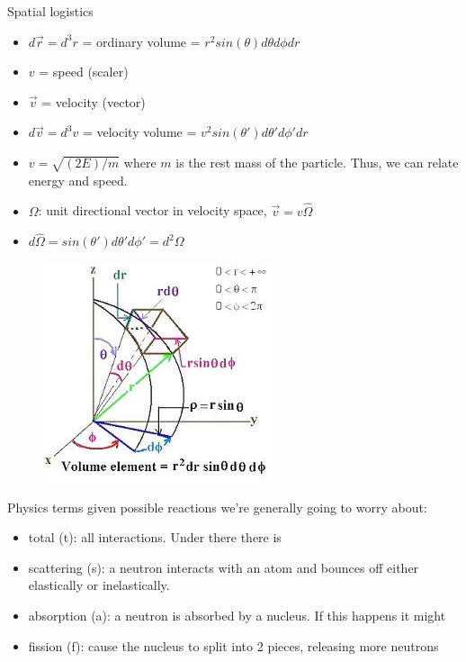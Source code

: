 \documentclass[12pt]{article}
\newcommand{\vOmega}{\ensuremath{\hat{\Omega}}}
\begin{document}
Spatial logistics
\begin{itemize}
\item $d\vec{r} = d^3r$ = ordinary volume = $r^2 sin(\theta) d\theta d\phi dr$
%
\item $v$ = speed (scaler)
\item $\vec{v}$ = velocity (vector)
\item $d\vec{v} = d^3v$ = velocity volume = $v^2 sin(\theta')d\theta' d\phi' dr$
\item $v = \sqrt{(2E)/m}$ where $m$ is the rest mass of the particle. Thus, we can relate energy and speed.

\item $\Omega$: unit directional vector in velocity space, $\vec{v} = v\vOmega$
\item $d\vOmega = sin(\theta')d\theta' d\phi' =  d^2\Omega$
\end{itemize}

\begin{figure}[h!]
\begin{center}
\includegraphics[height=2 in]{VolumeElement}
\end{center}
\end{figure}

Physics terms given possible reactions we're generally going to worry about:
\begin{itemize}
\item total (t): all interactions. Under there there is 
\item scattering (s): a neutron interacts with an atom and bounces off either elastically or inelastically.
\item absorption (a): a neutron is absorbed by a nucleus. If this happens it might
\item fission (f): cause the nucleus to split into 2 pieces, releasing more neutrons
\end{itemize}
\end{document}
